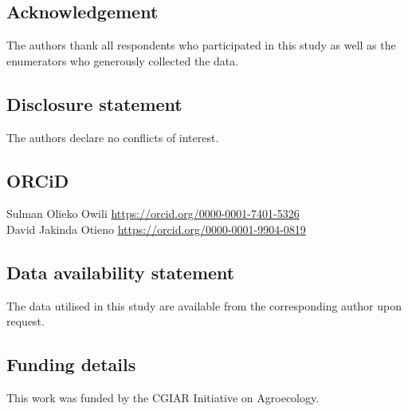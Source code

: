 \documentclass[fleqn,twoside,reqno]{article}
\begin{document}
\subsection*{Acknowledgement}
The authors thank all respondents who participated in this study as well as the enumerators who generously collected the data.

\subsection*{Disclosure statement}
The authors declare no conflicts of interest.

\subsection*{ORCiD}
Sulman Olieko Owili \textcolor{blue}{\href{https://orcid.org/0000-0001-7401-5326}{https://orcid.org/0000-0001-7401-5326}}\\
David Jakinda Otieno \textcolor{blue}{\href{https://orcid.org/0000-0001-9904-0819}{https://orcid.org/0000-0001-9904-0819}}

\subsection*{Data availability statement}
The data utilised in this study are available from the corresponding author upon request.

\subsection*{Funding details}
This work was funded by the CGIAR Initiative on Agroecology.
\printbibliography
\end{document}
